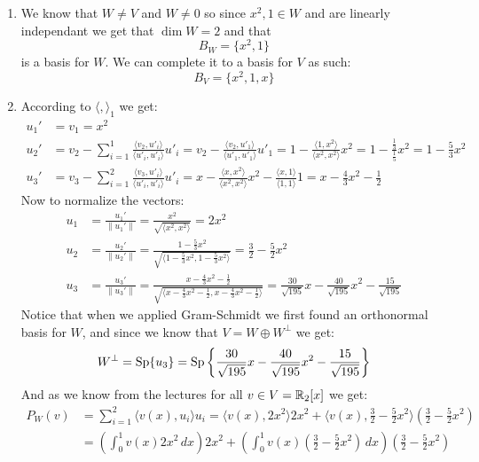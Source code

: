 \documentclass[11pt, a4paper]{article}
\begin{document}
\begin{solution} \phantom{}
  \begin{enumerate}
    \item[(1)]
  We know that $W\neq V$ and $W\neq 0$ so since $x^2,1\in W$ and are linearly
  independant we get that $\dim W=2$ and that
  \[
    B_W = \{x^2, 1\}
  \]
  is a basis for $W$. We can complete it to a basis for $V$ as such:
  \[
    B_V = \{x^2, 1, x\}
  \]

  \item[(2)]
  According to $\langle ,\rangle_1$ we get:
  \begin{align*}
    u_1' &= v_1 = x^2 \\
    u_2' &= v_2 - \sum_{i=1}^{1}
    {\frac{\langle v_2,u'_i\rangle}{\langle u'_i,u'_i\rangle}u'_i} = 
    v_2 - \frac{\langle v_2,u'_1\rangle}{\langle u'_1,u'_1\rangle} u'_1 = 
    1 - \frac{\langle 1,x^2\rangle}{\langle x^2,x^2\rangle} x^2 = 
    1 - \frac{\frac{1}{3}}{\frac{1}{5}} x^2 = 1 - \frac{5}{3}x^2 \\
    u_3' &= v_3 - \sum_{i=1}^{2}
    {\frac{\langle v_3,u'_i\rangle}{\langle u'_i,u'_i\rangle}u'_i} = 
    x - \frac{\langle x,x^2\rangle}{\langle x^2,x^2\rangle}x^2 - 
    \frac{\langle x,1\rangle}{\langle 1,1\rangle}1 = 
    x - \frac{4}{3}x^2 - \frac{1}{2}
  \end{align*}
  Now to normalize the vectors:
  \begin{align*}
    u_1 &= \frac{u_1'}{\|u_1'\|} = 
    \frac{x^2}{\sqrt{\langle x^2,x^2\rangle}} = 2x^2
    \\
    u_2 &= \frac{u_2'}{\|u_2'\|} = 
    \frac{1-\frac{5}{3}x^2}
    {\sqrt{\langle 1-\frac{5}{3}x^2,1-\frac{5}{3}x^2\rangle}} = 
    \frac{3}{2}-\frac{5}{2}x^2
    \\
    u_3 &= \frac{u_3'}{\|u_3'\|} = 
    \frac{x - \frac{4}{3}x^2 - \frac{1}{2}}
    {\sqrt{\langle x - \frac{4}{3}x^2 - \frac{1}{2},x - \frac{4}{3}x^2 - 
    \frac{1}{2}\rangle}} = 
    \frac{30}{\sqrt{195}}x-\frac{40}{\sqrt{195}}x^2-\frac{15}{\sqrt{195}}
  \end{align*}
  Notice that when we applied Gram-Schmidt we first found an orthonormal basis
  for $W$, and since we know that $V = W \oplus W^\bot$ we get:
  \[ W^\bot = \mathrm{Sp}\{u_3\} = \mathrm{Sp}
  \left\{\frac{30}{\sqrt{195}}x-\frac{40}{\sqrt{195}}
  x^2-\frac{15}{\sqrt{195}} \right\} \]
  And as we know from the lectures for all $v\in V = \mathbb{R}_2[x]$ we get:
  \begin{align*}
    P_W(v) &= \sum_{i=1}^{2}{\langle v(x),u_i \rangle u_i} = 
    \langle v(x),2x^2 \rangle 2x^2 + \langle v(x),\frac{3}{2} - 
    \frac{5}{2}x^2 \rangle \left(\frac{3}{2}-\frac{5}{2}x^2\right) \\ &= 
    \left(\int_{0}^{1}{v(x) 2x^2\,dx}\right) 2x^2 + 
    \left(\int_{0}^{1}{v(x)\left(\frac{3}{2} - \frac{5}{2}x^2\right)\,dx}
    \right) \left(\frac{3}{2}-\frac{5}{2}x^2\right)
  \end{align*}


\end{enumerate}
\end{solution}
\end{document}
